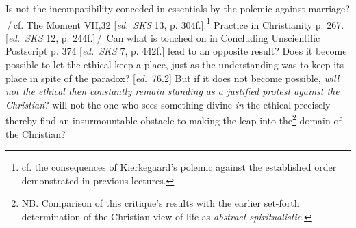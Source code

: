 \documentclass[12pt,a4paper,openany]{book}
\newcommand{\ed}[1]{{\small[\textit{ed.}\ #1]}}
\newcommand{\ins}[1]{\,/\,#1\,/\,}
\begin{document}
Is not the incompatibility conceded in essentials by the polemic
against marriage? \ins{cf. The Moment VII,32 \ed{\emph{SKS} 13, p.
304f.}.\footnote[135]{cf. the consequences of Kierkegaard's polemic against the established order demonstrated in previous lectures.} Practice in Christianity p. 267. \ed{\emph{SKS} 12, p. 244f.}}
Can what is touched on in Concluding Unscientific Postscript p. 374 \ed{\emph{SKS} 7, p.
442f.} lead to an opposite result? Does it become possible to let
the ethical keep a place, just as the understanding was to keep
its place in spite of the paradox? \ed{76.2} But if it does not become possible, \emph{will not
the ethical then constantly remain standing as a justified protest against the Christian}?
will not the one who sees something divine \emph{in} the ethical precisely
thereby find an insurmountable obstacle to making the leap into
the\footnote[136]{NB. Comparison of this critique's results with the earlier set-forth determination of the Christian view of life as \emph{abstract-spiritualistic}.} domain of the Christian?
\end{document}
